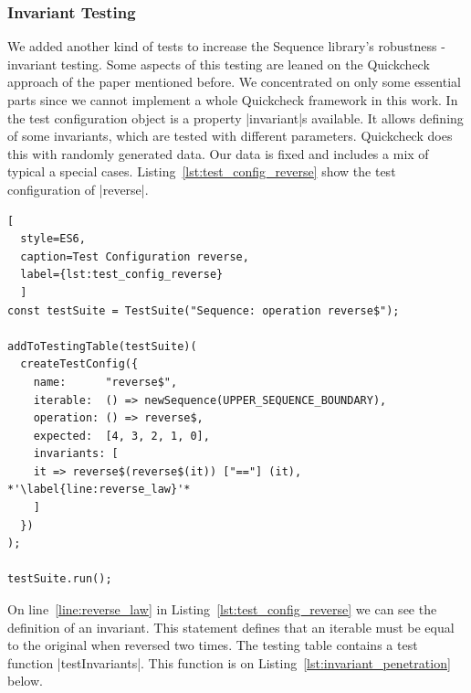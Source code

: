 \subsubsection{Invariant Testing}
\label{subsub:Invariant Testing}
We added another kind of tests to increase the Sequence library's robustness -
invariant testing. Some aspects of this testing are leaned on the Quickcheck
approach of the paper mentioned before. We concentrated on only some essential
parts since we cannot implement a whole Quickcheck framework in this work.
\newline
In the test configuration object
is a property |invariant|s available. It allows defining of some invariants, which are
tested with different parameters. Quickcheck does this with randomly generated
data. Our data is fixed and includes a mix of typical a special cases.
\newline
Listing~\ref{lst:test_config_reverse} show the test configuration of |reverse|.

\begin{lstlisting}[
  style=ES6, 
  caption=Test Configuration reverse,
  label={lst:test_config_reverse}
  ]
const testSuite = TestSuite("Sequence: operation reverse$");

addToTestingTable(testSuite)(
  createTestConfig({
    name:      "reverse$",
    iterable:  () => newSequence(UPPER_SEQUENCE_BOUNDARY),
    operation: () => reverse$,
    expected:  [4, 3, 2, 1, 0],
    invariants: [
    it => reverse$(reverse$(it)) ["=="] (it), *'\label{line:reverse_law}'*
    ]
  })
);

testSuite.run();
\end{lstlisting}
On line~\ref{line:reverse_law} in Listing~\ref{lst:test_config_reverse} we can 
see the definition of an invariant. This statement defines that an iterable must be 
equal to the original when reversed two times.
\newline
The testing table contains a test function |testInvariants|. This function is on
Listing~\ref{lst:invariant_penetration} below.


